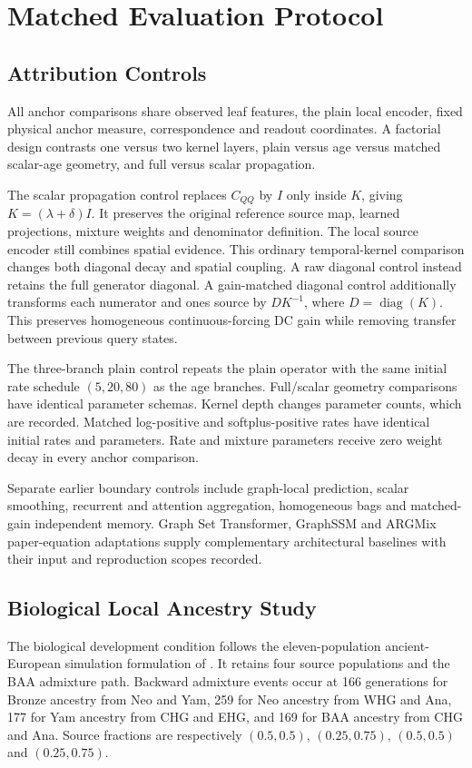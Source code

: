 \documentclass[letterpaper]{article}
\begin{document}
\section{Matched Evaluation Protocol}
\subsection{Attribution Controls}
All anchor comparisons share observed leaf features, the plain local encoder, fixed physical anchor measure, correspondence and readout coordinates. A factorial design contrasts one versus two kernel layers, plain versus age versus matched scalar-age geometry, and full versus scalar propagation.

The scalar propagation control replaces $C_{QQ}$ by $I$ only inside $K$, giving $K=(\lambda+\delta)I$. It preserves the original reference source map, learned projections, mixture weights and denominator definition. The local source encoder still combines spatial evidence. This ordinary temporal-kernel comparison changes both diagonal decay and spatial coupling. A raw diagonal control instead retains the full generator diagonal. A gain-matched diagonal control additionally transforms each numerator and ones source by $D K^{-1}$, where $D=\operatorname{diag}(K)$. This preserves homogeneous continuous-forcing DC gain while removing transfer between previous query states.

The three-branch plain control repeats the plain operator with the same initial rate schedule $(5,20,80)$ as the age branches. Full/scalar geometry comparisons have identical parameter schemas. Kernel depth changes parameter counts, which are recorded. Matched log-positive and softplus-positive rates have identical initial rates and parameters. Rate and mixture parameters receive zero weight decay in every anchor comparison.

Separate earlier boundary controls include graph-local prediction, scalar smoothing, recurrent and attention aggregation, homogeneous bags and matched-gain independent memory. Graph Set Transformer, GraphSSM and ARGMix paper-equation adaptations supply complementary architectural baselines with their input and reproduction scopes recorded.

\subsection{Biological Local Ancestry Study}
The biological development condition follows the eleven-population ancient-European simulation formulation of \citet{eurasians2024}. It retains four source populations and the BAA admixture path. Backward admixture events occur at 166 generations for Bronze ancestry from Neo and Yam, 259 for Neo ancestry from WHG and Ana, 177 for Yam ancestry from CHG and EHG, and 169 for BAA ancestry from CHG and Ana. Source fractions are respectively $(0.5,0.5)$, $(0.25,0.75)$, $(0.5,0.5)$ and $(0.25,0.75)$.
\end{document}
